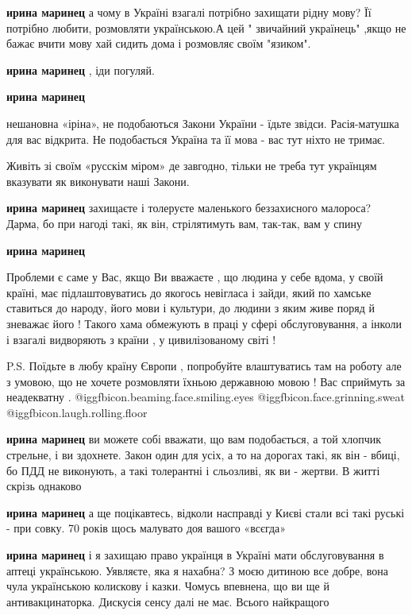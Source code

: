 \begin{itemize}
\begin{itemize}
\textbf{ирина маринец} а чому в Україні взагалі потрібно захищати рідну мову? Її потрібно любити, розмовляти українською.А цей " звичайний українець" ,якщо не бажає вчити мову хай сидить дома і розмовляє своїм "язиком".

\textbf{ирина маринец} , іди погуляй.

\textbf{ирина маринец} 

нешановна «іріна», не подобаються Закони України - їдьте звідси. Расія-матушка
для вас відкрита.  Не подобається Україна та її мова - вас тут ніхто не тримає.

Живіть зі своїм «русскім міром» де завгодно, тільки не треба тут українцям
вказувати як виконувати наші Закони.

\textbf{ирина маринец} захищаєте і толеруєте маленького беззахисного малороса? Дарма, бо при нагоді такі, як він, стрілятимуть вам, так-так, вам у спину

\textbf{ирина маринец} 

Проблеми є саме у Вас, якщо Ви вважаєте , що людина у себе вдома, у своїй
країні, має підлаштовуватись до якогось невігласа і зайди, який по хамське
ставиться до народу, його мови і культури, до людини з яким живе поряд й
зневажає його ! Такого хама обмежують в праці у сфері обслуговування, а інколи
і взагалі видворяють з країни , у цивилізованому світі !

P.S. Поїдьте в любу країну Європи , попробуйте влаштуватись там на роботу але з
умовою, що не хочете розмовляти їхньою державною мовою ! Вас сприймуть за
неадекватну . 
@igg{fbicon.beaming.face.smiling.eyes}  @igg{fbicon.face.grinning.sweat}  @igg{fbicon.laugh.rolling.floor} 

\textbf{ирина маринец} ви можете собі вважати, що вам подобається, а той хлопчик стрельне, і ви здохнете.
Закон один для усіх, а то на дорогах такі, як він - вбиці, бо ПДД не виконують, а такі толерантні і сльозливі, як ви - жертви.
В житті скрізь однаково

\textbf{ирина маринец} а ще поцікавтесь, відколи насправді у Києві стали всі такі руські - при совку. 70 років щось малувато доя вашого «всєгда»

\textbf{ирина маринец} і я захищаю право українця в Україні мати обслуговування в аптеці українською. Уявляєте, яка я нахабна?
З моєю дитиною все добре, вона чула українською колискову і казки.
Чомусь впевнена, що ви ще й антивакцинаторка.
Дискусія сенсу далі не має.
Всього найкращого



\end{itemize}
\end{itemize}
